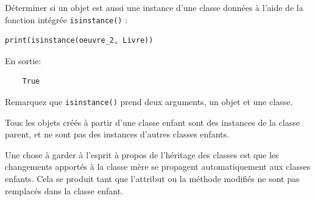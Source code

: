 \documentclass[a4paper,12pt]{book}
\begin{document}
Déterminer si un objet est aussi une instance d’une classe données à l’aide de la fonction intégrée \texttt{isinstance()} :
\begin{lstlisting}[caption=La fonction \texttt{isinstance()}]
print(isinstance(oeuvre_2, Livre))
\end{lstlisting}
\medskip

En sortie:
\begin{verbatim}
    True
\end{verbatim}
\medskip

Remarquez que \texttt{isinstance()} prend deux arguments, un objet et une classe.
\medskip

Tous les objets créés à partir d'une classe enfant sont des instances de la classe parent, et ne sont pas des instances d'autres classes enfants.
\medskip

Une chose à garder à l'esprit à propos de l'héritage des classes est que les changements apportés à la classe mère se propagent automatiquement aux classes enfants. Cela se produit tant que l'attribut ou la méthode modifiés ne sont pas remplacés dans la classe enfant.
\medskip
\end{document}
